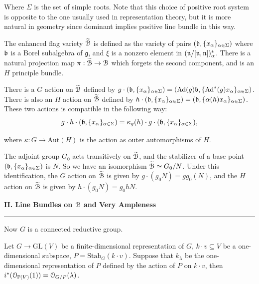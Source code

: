 \documentclass[12pt]{amsart}
\numberwithin{equation}{section}
\newcommand{\BP}{{\mathbb {P}}} \newcommand{\BQ}{{\mathbb {Q}}} \newcommand{\BR}{{\mathbb {R}}}
\newcommand{\fg}{\mathfrak{g}} \newcommand{\fh}{\mathfrak{h}} \newcommand{\fk}{\mathfrak{k}}
\newcommand{\GL}{{\mathrm{GL}}} \newcommand{\SL}{{\mathrm{SL}}} \newcommand{\SU}{{\mathrm{SU}}}
\newcommand{\Ad}{{\mathrm{Ad}}}   \newcommand{\ad}{{\mathrm{ad}}}
\renewcommand{\tilde}{\widetilde}
\begin{document}
Where $\Sigma$ is the set of simple roots. Note that this choice of positive root system is opposite to the one usually used in representation theory, but it is more natural in geometry since dominant implies positive line bundle in this way.

The enhanced flag variety $\tilde{\CB}$ is defined as the variety of pairs $(\mathfrak{b}, \{x_{\alpha}\}_{\alpha \in \Sigma})$ where $\mathfrak{b}$ is a Borel subalgebra of $\fg$, and $\xi$ is a nonzero element in $(\mathfrak{n}/[\mathfrak{n},\mathfrak{n}])^*_{\alpha}$. There is a natural projection map $\pi : \tilde{\CB} \to \CB$ which forgets the second component, and is an $H$ principle bundle.

There is a $G$ action on $\tilde{\CB}$ defined by $g \cdot (\fb, \{x_{\alpha}\}_{\alpha \in \Sigma}) = (\Ad(g)\fb, \{\Ad^*(g)x_{\alpha}\}_{\alpha \in \Sigma})$. There is also an $H$ action on $\tilde{\CB}$ defined by $h \cdot (\mathfrak{b}, \{x_{\alpha}\}_{\alpha \in \Sigma}) = (\mathfrak{b}, \{\alpha(h)x_{\alpha}\}_{\alpha \in \Sigma})$. These two actions is compatible in the following way:
\[
  g \cdot h \cdot (\mathfrak{b}, \{x_{\alpha}\}_{\alpha \in \Sigma}) = \kappa_{g}(h) \cdot g \cdot (\mathfrak{b}, \{x_{\alpha}\}_{\alpha \in \Sigma}),
\]  

where $\kappa: G \to \mathrm{Aut}(H)$ is the action as outer automorphisms of $H$.

The adjoint group $G_0$ acts transitively on $\tilde{\CB}$, and the stabilizer of a base point $(\mathfrak{b}, \{x_{\alpha}\}_{\alpha \in \Sigma})$ is $N$. So we have an isomorphism $\tilde{\CB} \simeq G_0/N$. Under this identification, the $G$ action on $\tilde{\CB}$ is given by $g \cdot (g_0N) = gg_0(N)$, and the $H$ action on $\tilde{\CB}$ is given by $h \cdot (g_0N) = g_0 hN$.

\vspace{5mm}



\noindent\textbf{\large II. Line Bundles on ${\mathcal {B}}$ and Very Ampleness}
\vspace{2mm}
\hrule 
\vspace{3mm}


Now $G$ is a connected reductive group.

\begin{lem}
  Let $G \to \GL(V)$ be a finite-dimensional representation of $G$, $k \cdot v \subseteq V$ be a one-dimensional subspace, $P = \mathrm{Stab}_G(k \cdot v)$. Suppose that $k_{\lambda}$ be the one-dimensional representation of $P$ defined by the action of $P$ on $k \cdot v$, then $i^*(\CO_{\BP(V)}(1)) = \CO_{G/P}(\lambda)$.
\end{lem}
\end{document}
